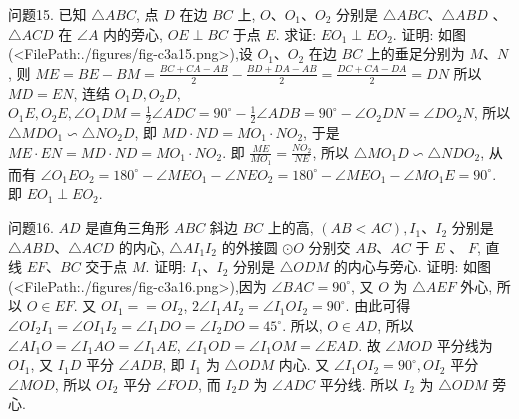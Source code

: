 问题15. 已知 $\triangle A B C$, 点 $D$ 在边 $B C$ 上, $O 、 O_1 、 O_2$ 分别是 $\triangle A B C 、 \triangle A B D$ 、 $\triangle A C D$ 在 $\angle A$ 内的旁心, $O E \perp B C$ 于点 $E$. 求证: $E O_1 \perp E O_2$.
证明: 如图(<FilePath:./figures/fig-c3a15.png>),设 $O_1 、 O_2$ 在边 $B C$ 上的垂足分别为 $M 、 N$, 则 $M E=B E-B M=\frac{B C+C A-A B}{2}-\frac{B D+D A-A B}{2}= \frac{D C+C A-D A}{2}=D N$ 所以 $M D=E N$, 连结 $O_1 D, O_2 D$, $O_1 E, O_2 E, \angle O_1 D M=\frac{1}{2} \angle A D C=90^{\circ}-\frac{1}{2} \angle A D B= 90^{\circ}-\angle O_2 D N=\angle D O_2 N$, 所以 $\triangle M D O_1 \backsim \triangle N O_2 D$, 即 $M D \cdot N D=M O_1 \cdot N O_2$, 于是 $M E \cdot E N=M D \cdot N D= M O_1 \cdot N O_2$. 即 $\frac{M E}{M O_1}=\frac{N O_2}{N E}$, 所以 $\triangle M O_1 D \backsim \triangle N D O_2$, 从而有 $\angle O_1 E O_2=180^{\circ}-\angle M E O_1-\angle N E O_2=180^{\circ}-\angle M E O_1- \angle M O_1 E=90^{\circ}$. 即 $E O_1 \perp E O_2$.



问题16. $A D$ 是直角三角形 $A B C$ 斜边 $B C$ 上的高, $(A B<A C), I_1 、 I_2$ 分别是 $\triangle A B D 、 \triangle A C D$ 的内心, $\triangle A I_1 I_2$ 的外接圆 $\odot O$ 分别交 $A B 、 A C$ 于 $E$ 、 $F$, 直线 $E F 、 B C$ 交于点 $M$. 证明: $I_1 、 I_2$ 分别是 $\triangle O D M$ 的内心与旁心.
证明: 如图(<FilePath:./figures/fig-c3a16.png>),因为 $\angle B A C=90^{\circ}$, 又 $O$ 为 $\triangle A E F$ 外心, 所以 $O \in E F$. 又 $O I_1==O I_2$, $2 \angle I_1 A I_2=\angle I_1 O I_2=90^{\circ}$. 由此可得 $\angle O I_2 I_1= \angle O I_1 I_2=\angle I_1 D O=\angle I_2 D O=45^{\circ}$. 所以, $O \in A D$, 所以 $\angle A I_1 O=\angle I_1 A O=\angle I_1 A E$, $\angle I_1 O D=\angle I_1 O M=\angle E A D$. 故 $\angle M O D$ 平分线为 $O I_1$, 又 $I_1 D$ 平分 $\angle A D B$, 即 $I_1$ 为 $\triangle O D M$ 内心.
又 $\angle I_1 O I_2=90^{\circ}, O I_2$ 平分 $\angle M O D$, 所以 $O I_2$ 平分 $\angle F O D$, 而 $I_2 D$ 为 $\angle A D C$ 平分线.
所以 $I_2$ 为 $\triangle O D M$ 旁心.


